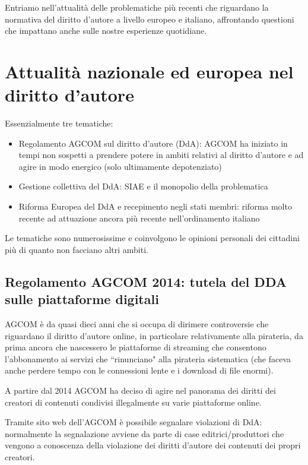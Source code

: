
Entriamo nell'attualità delle problematiche più recenti che riguardano la normativa del diritto d'autore a livello europeo e italiano, affrontando questioni che impattano anche sulle nostre esperienze quotidiane.  

\section{Attualità nazionale ed europea nel diritto d'autore}

Essenzialmente tre tematiche:
\begin{itemize}
    \item Regolamento AGCOM sul diritto d'autore (DdA): AGCOM ha iniziato in tempi non sospetti a prendere potere in ambiti relativi al diritto d'autore e ad agire in modo energico (solo ultimamente depotenziato)
    \item Gestione collettiva del DdA: SIAE e il monopolio della problematica 
    \item Riforma Europea del DdA e recepimento negli stati membri: riforma molto recente ad attuazione ancora più recente nell'ordinamento italiano

\end{itemize}

Le tematiche sono numerosissime e coinvolgono le opinioni personali dei cittadini più di quanto non facciano altri ambiti.

\subsection{Regolamento AGCOM 2014: tutela del DDA sulle piattaforme digitali}

AGCOM è da quasi dieci anni che si occupa di dirimere controversie che riguardano il diritto d'autore online, in particolare relativamente alla pirateria, da prima ancora che nascessero le piattaforme di streaming che consentono l'abbonamento ai servizi che ``rinunciano" alla pirateria sistematica (che faceva anche perdere tempo con le connessioni lente e i download di file enormi). 

A partire dal 2014 AGCOM ha deciso di agire nel panorama dei diritti dei creatori di contenuti condivisi illegalmente su varie piattaforme online. 

Tramite sito web dell'AGCOM è possibile segnalare violazioni di DdA: normalmente la segnalazione avviene da parte di case editrici/produttori che vengono a conoscenza della violazione dei diritti d'autore dei contenuti dei propri creatori. 

